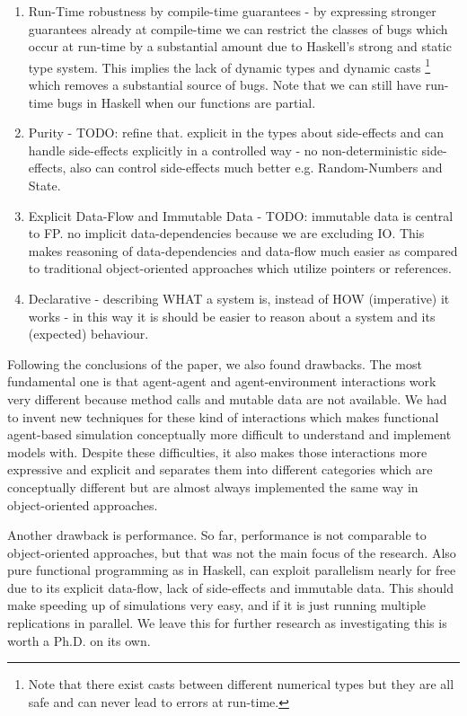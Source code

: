 \begin{enumerate}
	\item Run-Time robustness by compile-time guarantees - by expressing stronger guarantees already at compile-time we can restrict the classes of bugs which occur at run-time by a substantial amount due to Haskell's strong and static type system.  This implies the lack of dynamic types and dynamic casts \footnote{Note that there exist casts between different numerical types but they are all safe and can never lead to errors at run-time.} which removes a substantial source of bugs.  Note that we can still have run-time bugs in Haskell when our functions are partial.
	\item Purity - TODO: refine that. explicit in the types about side-effects and can handle side-effects explicitly in a controlled way - no non-deterministic side-effects, also can control side-effects much better e.g. Random-Numbers and State.
	\item Explicit Data-Flow and Immutable Data - TODO: immutable data is central to FP. no implicit data-dependencies because we are excluding IO. This makes reasoning of data-dependencies and data-flow much easier as compared to traditional object-oriented approaches which utilize pointers or references.
	\item Declarative - describing WHAT a system is, instead of HOW (imperative) it works - in this way it is should be easier to reason about a system and its (expected) behaviour.
\end{enumerate}

Following the conclusions of the paper, we also found drawbacks. The most fundamental one is that agent-agent and agent-environment interactions work very different because method calls and mutable data are not available. We had to invent new techniques for these kind of interactions which makes functional agent-based simulation conceptually more difficult to understand and implement models with. Despite these difficulties, it also makes those interactions more expressive and explicit and separates them into different categories which are conceptually different but are almost always implemented the same way in object-oriented approaches.

Another drawback is performance. So far, performance is not comparable to object-oriented approaches, but that was not the main focus of the research. Also pure functional programming as in Haskell, can exploit parallelism nearly for free due to its explicit data-flow, lack of side-effects and immutable data. This should make speeding up of simulations very easy, and if it is just running multiple replications in parallel. We leave this for further research as investigating this is worth a Ph.D. on its own.

